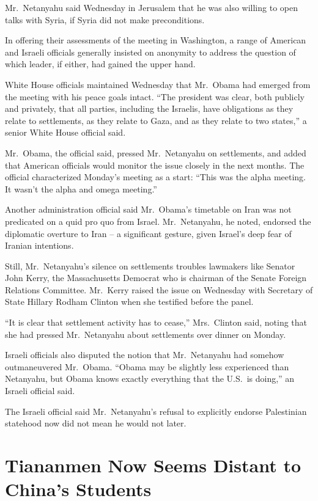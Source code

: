 \documentclass[12pt,a4paper,onecolumn]{article}
\begin{document}
Mr.~Netanyahu said Wednesday in Jerusalem that he was also willing to open talks with Syria, if
Syria did not make preconditions.

In offering their assessments of the meeting in Washington, a range of American and Israeli
officials generally insisted on anonymity to address the question of which leader, if either, had
gained the upper hand.

White House officials maintained Wednesday that Mr.~Obama had emerged from the meeting with his
peace goals intact. ``The president was clear, both publicly and privately, that all parties,
including the Israelis, have obligations as they relate to settlements, as they relate to Gaza, and
as they relate to two states,'' a senior White House official said.

Mr.~Obama, the official said, pressed Mr.~Netanyahu on settlements, and added that American
officials would monitor the issue closely in the next months. The official characterized Monday's
meeting as a start: ``This was the alpha meeting. It wasn't the alpha and omega meeting.''

Another administration official said Mr.~Obama's timetable on Iran was not predicated on a quid pro
quo from Israel. Mr.~Netanyahu, he noted, endorsed the diplomatic overture to Iran -- a significant
gesture, given Israel's deep fear of Iranian intentions.

Still, Mr.~Netanyahu's silence on settlements troubles lawmakers like Senator John Kerry, the
Massachusetts Democrat who is chairman of the Senate Foreign Relations Committee. Mr.~Kerry raised
the issue on Wednesday with Secretary of State Hillary Rodham Clinton when she testified before the
panel.

``It is clear that settlement activity has to cease,'' Mrs.~Clinton said, noting that she had
pressed Mr.~Netanyahu about settlements over dinner on Monday.

Israeli officials also disputed the notion that Mr.~Netanyahu had somehow outmaneuvered Mr.~Obama.
``Obama may be slightly less experienced than Netanyahu, but Obama knows exactly everything that the
U.S.~is doing,'' an Israeli official said.

The Israeli official said Mr.~Netanyahu's refusal to explicitly endorse Palestinian statehood now
did not mean he would not later.

\section{Tiananmen Now Seems Distant to China's Students}
\end{document}
